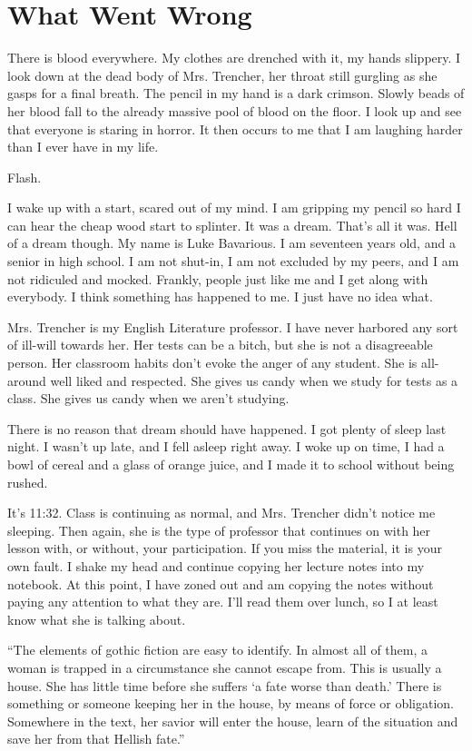 \chapter{What Went Wrong}



There is blood everywhere. My clothes are drenched with it, my
hands slippery. I look down at the dead body of Mrs. Trencher, her
throat still gurgling as she gasps for a final breath. The pencil
in my hand is a dark crimson. Slowly beads of her blood fall to the
already massive pool of blood on the floor. I look up and see that
everyone is staring in horror. It then occurs to me that I am
laughing harder than I ever have in my life.

Flash.

I wake up with a start, scared out of my mind. I am gripping my
pencil so hard I can hear the cheap wood start to splinter. It was
a dream. That's all it was. Hell of a dream though. My name
is Luke Bavarious. I am seventeen years old, and a senior in high
school. I am not shut-in, I am not excluded by my peers, and I am
not ridiculed and mocked. Frankly, people just like me and I get
along with everybody. I think something has happened to me. I just
have no idea what.

Mrs. Trencher is my English Literature professor. I have never
harbored any sort of ill-will towards her. Her tests can be a
bitch, but she is not a disagreeable person. Her classroom habits
don't evoke the anger of any student. She is all-around well
liked and respected. She gives us candy when we study for tests as
a class. She gives us candy when we aren't studying.

There is no reason that dream should have happened. I got plenty of
sleep last night. I wasn't up late, and I fell asleep right
away. I woke up on time, I had a bowl of cereal and a glass of
orange juice, and I made it to school without being rushed.

It's 11:32. Class is continuing as normal, and Mrs. Tren\-cher
didn't notice me sleeping. Then again, she is the type of
professor that continues on with her lesson with, or without, your
participation. If you miss the material, it is your own fault. I
shake my head and continue copying her lecture notes into my
notebook. At this point, I have zoned out and am copying the notes
without paying any attention to what they are. I'll read them
over lunch, so I at least know what she is talking about.

``The elements of gothic fiction are easy to identify. In
almost all of them, a woman is trapped in a circumstance she cannot
escape from. This is usually a house. She has little time before
she suffers `a fate worse than death.' There is
something or someone keeping her in the house, by means of force or
obligation. Somewhere in the text, her savior will enter the house,
learn of the situation and save her from that Hellish
fate.''



